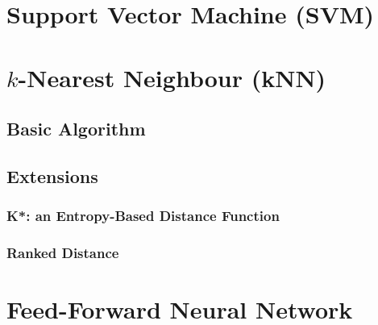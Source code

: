 \section{Support Vector Machine (SVM)}

\section{$k$-Nearest Neighbour (kNN)}
\subsection{Basic Algorithm}

\subsection{Extensions}
\subsubsection{K*: an Entropy-Based Distance Function}

\subsubsection{Ranked Distance}

\section{Feed-Forward Neural Network}
